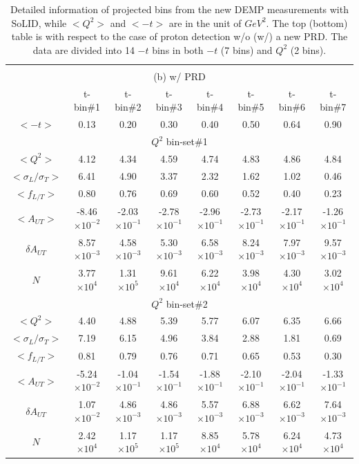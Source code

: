 \begin{table}[!ht]
\begin{tabular}{|c|c|c|c|c|c|c|c|}
   	     
     \hline
	  \multicolumn{8}{c}{} \\
	  \multicolumn{8}{c}{ (b) w/ PRD} \\
	   \hline
	     &  t-bin\#1 & t-bin\#2 & t-bin\#3 & t-bin\#4 & t-bin\#5 & t-bin\#6 & t-bin\#7 \\
     	\hline 
		    $<-t>$                &  0.13 & 0.20   & 0.30   & 0.40   & 0.50   & 0.64   & 0.90  \\
	    \hline
   	   \multicolumn{8}{|c|}{$Q^{2}$ bin-set\#1 } \\
   	    \hline
$<Q^{2}>$   &  4.12 &  4.34 & 4.59 & 4.74 & 4.83 & 4.86 & 4.84 \\
$<\sigma_{L}/\sigma_{T}>$    &  6.41 &  4.90 & 3.37 & 2.32 & 1.62 & 1.02 & 0.46 \\
$<f_{L/T}>$   &  0.80 &  0.76 & 0.69 & 0.60 & 0.52 & 0.40 & 0.23 \\
$<A_{UT}>$ &  -8.46$\times 10^{-2}$ &  -2.03$\times 10^{-1}$ & -2.78$\times 10^{-1}$ & -2.96$\times 10^{-1}$ & -2.73$\times 10^{-1}$ & -2.17$\times 10^{-1}$ & -1.26$\times 10^{-1}$ \\
$\delta A_{UT}$  &  8.57$\times 10^{-3}$ &  4.58$\times 10^{-3}$ & 5.30$\times 10^{-3}$ & 6.58$\times 10^{-3}$ & 8.24$\times 10^{-3}$ & 7.97$\times 10^{-3}$ & 9.57$\times 10^{-3}$ \\
$N$     &  3.77$\times 10^{4}$ &  1.31$\times 10^{5}$ & 9.61$\times 10^{4}$ & 6.22$\times 10^{4}$ & 3.98$\times 10^{4}$ & 4.30$\times 10^{4}$ & 3.02$\times 10^{4}$ \\   
    \hline
     	   \multicolumn{8}{|c|}{$Q^{2}$ bin-set\#2 } \\
  \hline 
$<Q^{2}>$   &  4.40 &  4.88 & 5.39 & 5.77 & 6.07 & 6.35 & 6.66 \\
$<\sigma_{L}/\sigma_{T}>$   &  7.19 &  6.15 & 4.96 & 3.84 & 2.88 & 1.81 & 0.69 \\
$<f_{L/T}>$     &  0.81 &  0.79 & 0.76 & 0.71 & 0.65 & 0.53 & 0.30 \\
$<A_{UT}>$   &  -5.24$\times 10^{-2}$ &  -1.04$\times 10^{-1}$ & -1.54$\times 10^{-1}$ & -1.88$\times 10^{-1}$ & -2.10$\times 10^{-1}$ & -2.04$\times 10^{-1}$ & -1.33$\times 10^{-1}$ \\
$\delta A_{UT}$   &  1.07$\times 10^{-2}$ &  4.86$\times 10^{-3}$ & 4.86$\times 10^{-3}$ & 5.57$\times 10^{-3}$ & 6.88$\times 10^{-3}$ & 6.62$\times 10^{-3}$ & 7.64$\times 10^{-3}$ \\
$N$    &  2.42$\times 10^{4}$ &  1.17$\times 10^{5}$ & 1.17$\times 10^{5}$ & 8.85$\times 10^{4}$ & 5.78$\times 10^{4}$ & 6.24$\times 10^{4}$ & 4.73$\times 10^{4}$ \\
     \hline
	\end{tabular}
	\caption[Detailed information of projected bins]{\footnotesize{Detailed information of projected bins from the new DEMP measurements with SoLID, while $<Q^{2}>$ and $<-t>$ are in the unit of $GeV^{2}$. The top (bottom) table is with respect to the case of proton detection w/o (w/) a new PRD. The data are divided into 14 $-t$ bins in both $-t$ (7 bins) and $Q^{2}$ (2 bins).}}
	\label{asym_bin_table}
\end{table} 


